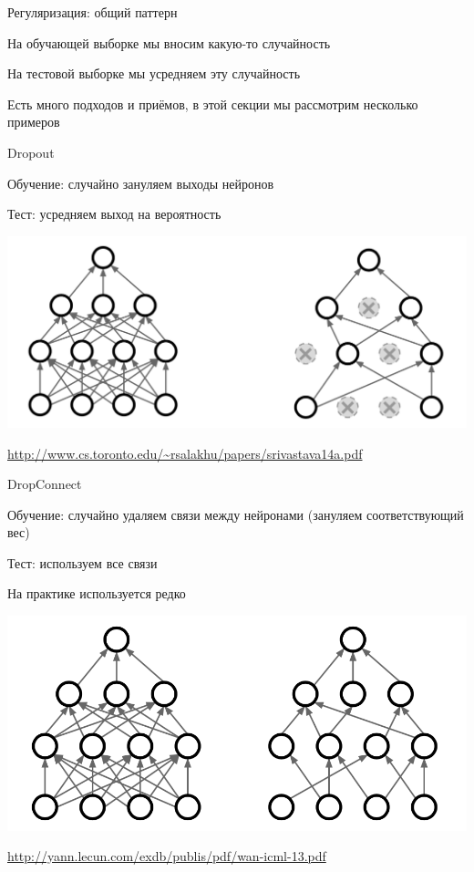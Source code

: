 \documentclass[notes,12pt, aspectratio=169]{beamer}
\newenvironment{wideitemize}{\itemize\addtolength{\itemsep}{10pt}}{\enditemize}
\begin{document}
\begin{frame}{Регуляризация: общий паттерн} 
	\begin{wideitemize}
		\item  На обучающей выборке мы вносим какую-то случайность 
		\item  На тестовой выборке мы усредняем эту случайность
		\item  Есть много подходов и приёмов, в этой секции мы рассмотрим несколько примеров
	\end{wideitemize}
\end{frame}


\begin{frame}{Dropout}
\begin{wideitemize}	
		\item \alert{Обучение:}  случайно зануляем выходы нейронов
		\item \alert{Тест:} усредняем выход на вероятность 
	\end{wideitemize}
	\begin{center}
		\includegraphics[width=0.55\paperwidth]{dropout_st.png}
	\end{center}
	\vfill %
	\footnotesize
	{\color{blue} \url{http://www.cs.toronto.edu/~rsalakhu/papers/srivastava14a.pdf}}
\end{frame}


\begin{frame}{DropConnect}
	\begin{wideitemize}	
		\item \alert{Обучение:}  случайно удаляем связи между нейронами (зануляем соответствующий вес)
		\item \alert{Тест:} используем все связи 
		\item На практике используется редко 
	\end{wideitemize}
	\begin{center}
		\includegraphics[width=0.5\paperwidth]{dropconnect.png}
	\end{center}
	\vfill %
	\footnotesize
	{\color{blue} \url{http://yann.lecun.com/exdb/publis/pdf/wan-icml-13.pdf}}
\end{frame}
\end{document}

